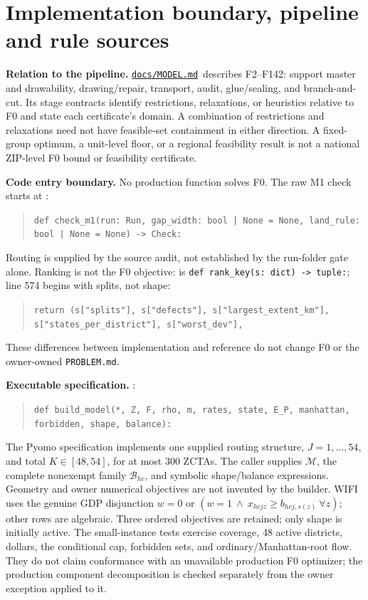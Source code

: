 \documentclass[11pt,letterpaper]{article}
\newcommand{\MODEL}{\href{MODEL.md}{\texttt{docs/MODEL.md}}}
\begin{document}
\section{Implementation boundary, pipeline and rule sources}
\textbf{Relation to the pipeline.} \MODEL\ describes F2--F142: support
master and drawability, drawing/repair, transport, audit, glue/sealing,
and branch-and-cut. Its stage contracts identify restrictions,
relaxations, or heuristics relative to F0 and state each certificate's
domain. A combination of restrictions and relaxations need not have
feasible-set containment in either direction. A fixed-group optimum,
a unit-level floor, or a regional feasibility result is not a national
ZIP-level F0 bound or feasibility certificate.

\textbf{Code entry boundary.} No production function solves F0.
The raw M1 check starts at :
\begin{quote}\scriptsize
\verb!def check_m1(run: Run, gap_width: bool | None = None, land_rule: bool | None = None) -> Check:!
\end{quote}
Routing is supplied by the source audit, not established by the run-folder
gate alone. Ranking is not the F0 objective:
 is \verb|def rank_key(s: dict) -> tuple:|;
line 574 begins with splits, not shape:
\begin{quote}\fontsize{7}{9}\selectfont
\verb|return (s["splits"], s["defects"], s["largest_extent_km"], s["states_per_district"], s["worst_dev"],|
\end{quote}
These differences between implementation and reference do not change F0
or the owner-owned \texttt{PROBLEM.md}.

\textbf{Executable specification.} :
\begin{quote}\scriptsize
\verb|def build_model(*, Z, F, rho, m, rates, state, E_P, manhattan, forbidden, shape, balance):|
\end{quote}
The Pyomo specification implements one supplied routing structure,
$J=1,\ldots,54$, and total $K\in[48,54]$, for at most 300 ZCTAs.
The caller supplies $\mathcal M$, the complete nonexempt family
$\mathcal B_{hc}$, and symbolic shape/balance expressions. Geometry and
owner numerical objectives are not invented by the builder.
WIFI uses the genuine GDP disjunction $w=0$ or
$(w=1\ \land\ x_{hcjz}\ge b_{hcj,s(z)}\ \forall z)$; other rows are algebraic.
Three ordered objectives are retained; only shape is initially active.
The small-instance tests exercise coverage, 48 active districts, dollars,
the conditional cap, forbidden sets, and ordinary/Manhattan-root flow.
They do not claim conformance with an unavailable production F0 optimizer;
the production component decomposition is checked separately from the
owner exception applied to it.
\end{document}
